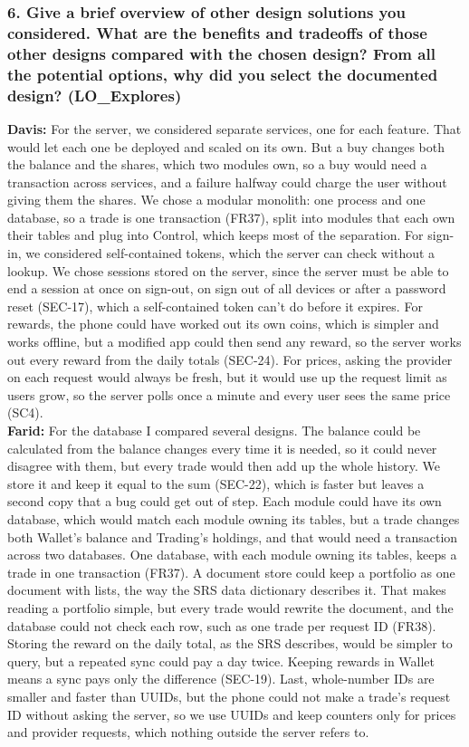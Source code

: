 \documentclass[12pt, titlepage]{article}
\begin{document}
\subsubsection*{6. Give a brief overview of other design solutions you
considered. What are the benefits and tradeoffs of those other designs compared
with the chosen design? From all the potential options, why did you select the
documented design? (LO\_Explores)}

\noindent\textbf{Davis:} For the server, we considered separate services, one
for each feature. That would let each one be deployed and scaled on its own.
But a buy changes both the balance and the shares, which two modules own, so a
buy would need a transaction across services, and a failure halfway could
charge the user without giving them the shares. We chose a modular monolith:
one process and one database, so a trade is one transaction (FR37), split into
modules that each own their tables and plug into Control, which keeps most of
the separation. For sign-in, we considered self-contained tokens, which the
server can check without a lookup. We chose sessions stored on the server,
since the server must be able to end a session at once on sign-out, on sign
out of all devices or after a password reset (SEC-17), which a self-contained
token can't do before it expires. For rewards, the phone could have worked out
its own coins, which is simpler and works offline, but a modified app could
then send any reward, so the server works out every reward from the daily
totals (SEC-24). For prices, asking the provider on each request would always
be fresh, but it would use up the request limit as users grow, so the server
polls once a minute and every user sees the same price (SC4). \\

\noindent\textbf{Farid:} For the database I compared several designs.
The balance could be calculated from the balance changes every time it is
needed, so it could never disagree with them, but every trade would then add up
the whole history. We store it and keep it equal to the sum (SEC-22), which is
faster but leaves a second copy that a bug could get out of step. Each module
could have its own database, which would match each module owning its tables,
but a trade changes both Wallet's balance and Trading's holdings, and that
would need a transaction across two databases. One database, with each module
owning its tables, keeps a trade in one transaction (FR37). A document store
could keep a portfolio as one document with lists, the way the SRS data
dictionary describes it. That makes reading a portfolio simple, but every trade
would rewrite the document, and the database could not check each row, such as
one trade per request ID (FR38). Storing the reward on the daily total, as the
SRS describes, would be simpler to query, but a repeated sync could pay a day
twice. Keeping rewards in Wallet means a sync pays only the difference
(SEC-19). Last, whole-number IDs are smaller and faster than UUIDs, but the
phone could not make a trade's request ID without asking the server, so we use
UUIDs and keep counters only for prices and provider requests, which nothing
outside the server refers to.
\end{document}
